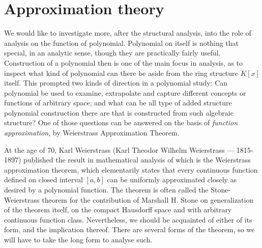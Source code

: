 \section{Approximation theory}

We would like to investigate more, after the structural analysis, into the role of analysis on the function of polynomial. Polynomial on itself is nothing that special, in an analytic sense, though they are practically fairly useful. Construction of a polynomial then is one of the main focus in analysis, as to inspect what kind of polynomial can there be aside from the ring structure $K[x]$ itself. This prompted two kinds of direction in a polynomial study: Can polynomial be used to examine, extrapolate and capture different concepts or functions of arbitrary space; and what can be all type of added structure polynomial construction there are that is constructed from such algebraic structure? One of those questions can be answered on the basis of \textit{function approximation}, by Weierstrass Approximation Theorem. 

At the age of 70, Karl Weierstrass (Karl Theodor Wilhelm Weierstrass --- 1815-1897) published the result in mathematical analysis of which is the Weierstrass approximation theorem, which elementarily states that every continuous function defined on closed interval $[a,b]$ can be uniformly approximated closely as desired by a polynomial function. The theorem is often called the Stone-Weierstrass theorem for the contribution of Marshall H. Stone on generalization of the theorem itself, on the compact Hausdorff space and with arbitrary continuous function class. Nevertheless, we should be acquainted of either of its form, and the implication thereof. There are several forms of the theorem, so we will have to take the long form to analyse such. 

